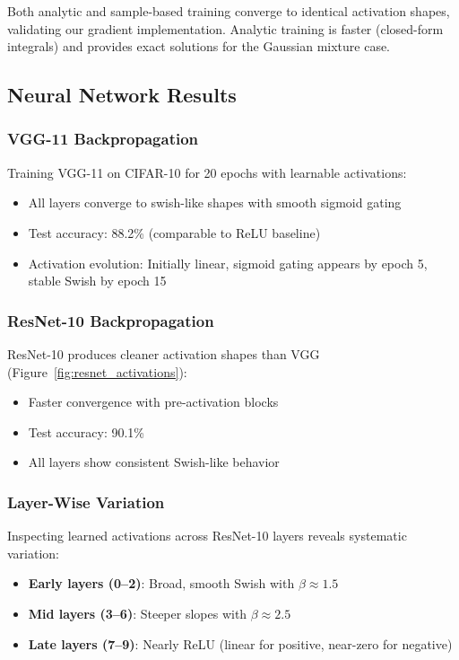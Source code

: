 \documentclass{article}
\begin{document}
Both analytic and sample-based training converge to identical activation shapes, validating our gradient implementation. Analytic training is faster (closed-form integrals) and provides exact solutions for the Gaussian mixture case.

\subsection{Neural Network Results}

\subsubsection{VGG-11 Backpropagation}

Training VGG-11 on CIFAR-10 for 20 epochs with learnable activations:
\begin{itemize}
\item All layers converge to swish-like shapes with smooth sigmoid gating
\item Test accuracy: 88.2\% (comparable to ReLU baseline)
\item Activation evolution: Initially linear, sigmoid gating appears by epoch 5, stable Swish by epoch 15
\end{itemize}

\subsubsection{ResNet-10 Backpropagation}

ResNet-10 produces cleaner activation shapes than VGG (Figure~\ref{fig:resnet_activations}):
\begin{itemize}
\item Faster convergence with pre-activation blocks
\item Test accuracy: 90.1\%
\item All layers show consistent Swish-like behavior
\end{itemize}

\subsubsection{Layer-Wise Variation}

Inspecting learned activations across ResNet-10 layers reveals systematic variation:
\begin{itemize}
\item \textbf{Early layers (0--2)}: Broad, smooth Swish with $\beta \approx 1.5$
\item \textbf{Mid layers (3--6)}: Steeper slopes with $\beta \approx 2.5$
\item \textbf{Late layers (7--9)}: Nearly ReLU (linear for positive, near-zero for negative)
\end{itemize}
\end{document}
